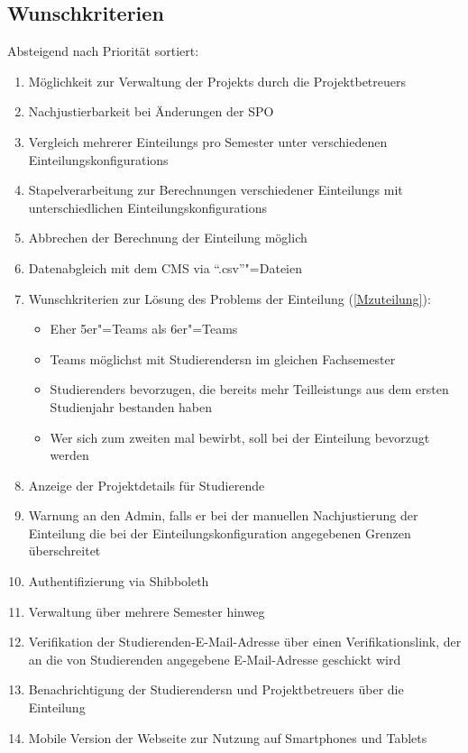 \documentclass[parskip=full]{scrartcl}
\newcommand{\swtLabel}[1]{\textbf{/#1\arabic*0/}}
\begin{document}
\subsection{Wunschkriterien}
Absteigend nach Priorität sortiert:
\begin{enumerate}[label=\swtLabel{W}]
  \item Möglichkeit zur Verwaltung der \glspl{Projekt} durch die \glspl{Projektbetreuer}
      \item Nachjustierbarkeit bei Änderungen der \gls{SPO} 
  
    \item Vergleich mehrerer \glspl{Einteilung} pro Semester unter verschiedenen \glspl{Einteilungskonfiguration}
  \item Stapelverarbeitung zur Berechnungen verschiedener \glspl{Einteilung} mit
    unterschiedlichen \glspl{Einteilungskonfiguration}
  \item Abbrechen der Berechnung der \gls{Einteilung} möglich 
        \item Datenabgleich mit dem \gls{CMS} via \enquote{.csv}"=Dateien 

    \item Wunschkriterien zur Lösung des Problems der \gls{Einteilung} (\ref{Mzuteilung}):
    \begin{itemize}
        \item Eher 5er"=\glspl{Team} als 6er"=\glspl{Team}
        \item \glspl{Team} möglichst mit \glspl{Studierender}n im gleichen
        Fachsemester
        \item \glspl{Studierender} bevorzugen, die bereits mehr \glspl{Teilleistung} aus dem
        ersten Studienjahr bestanden haben
        \item Wer sich zum zweiten mal bewirbt, soll bei der \gls{Einteilung} bevorzugt werden
    \end{itemize}    
\item Anzeige der Projektdetails für Studierende %
\item Warnung an den \gls{Admin}, falls er bei der manuellen Nachjustierung 
    der Einteilung die bei der \gls{Einteilungskonfiguration} angegebenen Grenzen überschreitet
    \item Authentifizierung via Shibboleth
    \item Verwaltung über mehrere Semester hinweg
    \item Verifikation der Studierenden-E-Mail-Adresse über einen
    Verifikationslink, der an die von Studierenden angegebene E-Mail-Adresse
    geschickt wird
    \item Benachrichtigung der \glspl{Studierender}n und \glspl{Projektbetreuer}
    über die \gls{Einteilung}
    
    
    \item Mobile Version der Webseite zur Nutzung auf Smartphones und Tablets
    
\end{enumerate}
\end{document}
